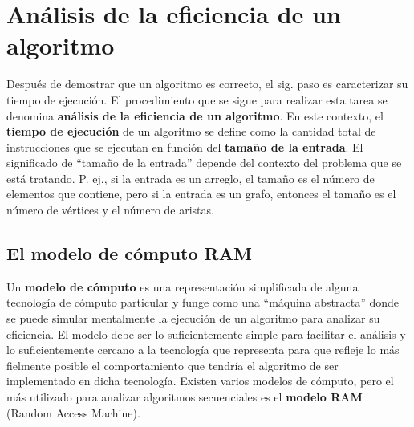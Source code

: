 \chapter{Análisis de la eficiencia de un algoritmo}

Después de demostrar que un algoritmo es correcto, el sig. paso es caracterizar su tiempo de ejecución. 
El procedimiento que se sigue para realizar esta tarea se denomina \textbf{análisis de la eficiencia de un algoritmo}. 
En este contexto, el \textbf{tiempo de ejecución} de un algoritmo se define como la cantidad total de instrucciones que se ejecutan en función del \textbf{tamaño de la entrada}. 
El significado de ``tamaño de la entrada'' depende del contexto del problema que se está tratando.
P. ej., si la entrada es un arreglo, el tamaño es el número de elementos que contiene, pero si la entrada es un grafo, entonces el tamaño es el número de vértices y el número de aristas. 

\section{El modelo de cómputo RAM}

Un \textbf{modelo de cómputo} es una representación simplificada de alguna tecnología de cómputo particular y funge como una ``máquina abstracta'' donde se puede simular mentalmente la ejecución de un algoritmo para analizar su eficiencia. 
El modelo debe ser lo suficientemente simple para facilitar el análisis y lo suficientemente cercano a la tecnología que representa para que refleje lo más fielmente posible el comportamiento que tendría el algoritmo de ser implementado en dicha tecnología. 
Existen varios modelos de cómputo, pero el más utilizado para analizar algoritmos secuenciales es el \textbf{modelo RAM} (Random Access Machine). 

